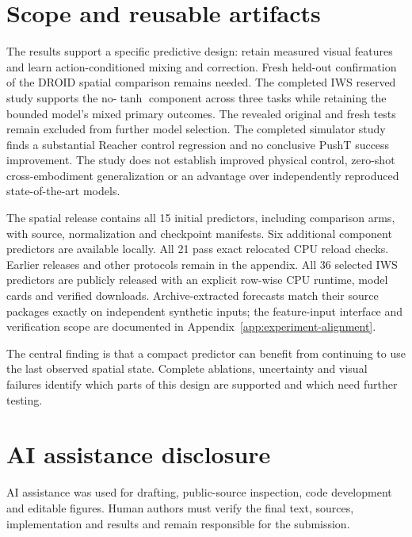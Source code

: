 \section{Scope and reusable artifacts}
The results support a specific predictive design: retain measured visual
features and learn action-conditioned mixing and correction. Fresh held-out
confirmation of the DROID spatial comparison remains needed. The completed IWS
reserved study supports the no-$\tanh$ component across three tasks while
retaining the bounded model's mixed primary outcomes.
The revealed original and fresh tests remain excluded from further model
selection. The completed simulator study finds a substantial Reacher control regression
and no conclusive PushT success improvement. The study does not establish
improved physical control, zero-shot
cross-embodiment generalization or an advantage over independently reproduced
state-of-the-art models.

The spatial release contains all 15 initial predictors, including comparison
arms, with source, normalization and checkpoint manifests. Six additional
component predictors are available locally. All 21 pass exact relocated CPU
reload checks. Earlier releases and other protocols remain in the appendix.
All 36 selected IWS predictors are publicly released with an explicit row-wise
CPU runtime, model cards and verified downloads. Archive-extracted forecasts
match their source packages exactly on independent synthetic inputs; the
feature-input interface and verification scope are documented in
Appendix~\ref{app:experiment-alignment}.

The central finding is that a compact predictor can benefit from continuing
to use the last observed spatial state. Complete ablations, uncertainty and
visual failures identify which parts of this design are supported and which
need further testing.

\section*{AI assistance disclosure}
AI assistance was used for drafting, public-source inspection, code development
and editable figures. Human authors must verify the final text, sources,
implementation and results and remain responsible for the submission.

